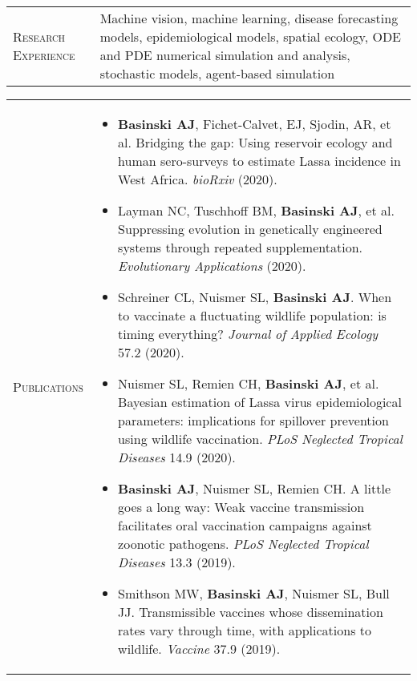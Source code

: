 \documentclass[11pt]{article}
\newcommand{\cellone}{3.5cm} %
\newcommand{\celltwo}{11cm}
\newcommand{\spa}{\vspace{.4in}}
\begin{document}
\begin{tabularx}{\textwidth}{p{\cellone} p{\celltwo}}
  \parbox[t][0cm]{\cellone}{R\textsc{esearch} E\textsc{xperience}} &  \parbox[t][0cm]{12cm}{
    Machine vision, machine learning, disease forecasting models, epidemiological models, spatial ecology, ODE and PDE numerical simulation and analysis, stochastic models, agent-based simulation}
\end{tabularx}

\spa
\spa

\begin{tabularx}{\textwidth}{p{\cellone} p{\celltwo}}
  \parbox[t][0cm]{\cellone}{P\textsc{ublications}} &  \parbox[t][0cm]{12cm}{ 

    \vspace{-0.65cm}
    \begin{itemize}

    \item {\bf Basinski AJ}, Fichet-Calvet, EJ, Sjodin, AR, et al. Bridging the gap: Using reservoir ecology and human sero-surveys to estimate Lassa incidence in West Africa. \emph{bioRxiv} (2020).

      \vspace{0.05in}      

    \item Layman NC, Tuschhoff BM, {\bf Basinski AJ}, et al. Suppressing evolution in genetically engineered systems through repeated supplementation. \emph{Evolutionary Applications} (2020).
      
      \vspace{0.05in}
      
    \item Schreiner CL, Nuismer SL, {\bf Basinski AJ}. When to vaccinate a fluctuating wildlife population: is timing everything? \emph{Journal of Applied Ecology} 57.2 (2020). 

      \vspace{0.05in}      
      
    \item Nuismer SL, Remien CH, {\bf Basinski AJ}, et al. Bayesian estimation of Lassa virus epidemiological parameters: implications for spillover prevention using wildlife vaccination. \emph{PLoS Neglected Tropical Diseases} 14.9 (2020).
      
      \vspace{0.05in}
      
    \item {\bf Basinski AJ}, Nuismer SL, Remien CH. A little goes a long way: Weak vaccine transmission facilitates oral vaccination campaigns against zoonotic pathogens. \emph{PLoS Neglected Tropical Diseases} 13.3 (2019).

      \vspace{0.05in}

      \item Smithson MW, {\bf Basinski AJ}, Nuismer SL, Bull JJ. Transmissible vaccines whose dissemination rates vary through time, with applications to wildlife. \emph{Vaccine} 37.9 (2019).
            
    \end{itemize}
  }
\end{tabularx}
\end{document}
